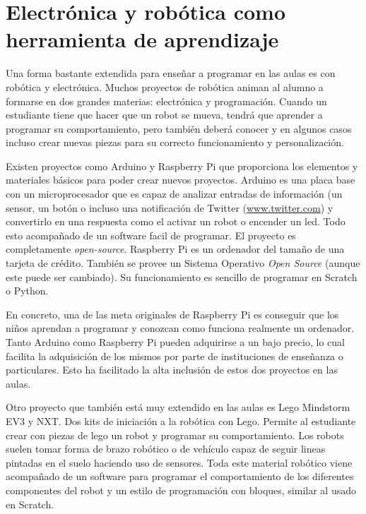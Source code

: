 \section{Electrónica y robótica como herramienta de aprendizaje}
\label{sec:electronica-robotica}


Una forma bastante extendida para enseñar a programar en las aulas es con robótica y electrónica. Muchos proyectos de robótica animan al alumno a formarse en dos grandes materias: electrónica y programación. Cuando un estudiante tiene que hacer que un robot se mueva, tendrá que aprender a programar su comportamiento, pero también deberá conocer y en algunos casos incluso crear nuevas piezas para su correcto funcionamiento y personalización.

Existen proyectos como Arduino\cite{arduino} y Raspberry Pi\cite{raspberry-pi} que proporciona los elementos y materiales básicos para poder crear nuevos proyectos. Arduino es una placa base con un microprocesador que es capaz de analizar entradas de información (un sensor, un botón o incluso una notificación de Twitter (\url{www.twitter.com}) y convertirlo en una respuesta como el activar un robot o encender un led. Todo esto acompañado de un software facil de programar. El proyecto es completamente \emph{\gls{open-source}}. Raspberry Pi es un ordenador del tamaño de una tarjeta de crédito. También se provee un Sistema Operativo \emph{Open Source} (aunque este puede ser cambiado). Su funcionamiento es sencillo de programar en Scratch\cite{scratch} o Python\cite{python,lutz2013learning}.

En concreto, una de las meta originales de Raspberry Pi es conseguir que los niños aprendan a programar y conozcan como funciona realmente un ordenador. Tanto Arduino como Raspberry Pi pueden adquirirse a un bajo precio, lo cual facilita la adquisición de los mismos por parte de instituciones de enseñanza o particulares. Esto ha facilitado la alta inclusión de estos dos proyectos en las aulas.

Otro proyecto que también está muy extendido en las aulas es Lego Mindstorm EV3 y NXT\cite{lego-mindstorm}. Dos kits de iniciación a la robótica con Lego. Permite al estudiante crear con piezas de lego un robot y programar su comportamiento. Los robots suelen tomar forma de brazo robótico o de vehículo capaz de seguir lineas pintadas en el suelo haciendo uso de sensores. Toda este material robótico viene acompañado de un software para programar el comportamiento de los diferentes componentes del robot y un estilo de programación con bloques\cite{lego-mindstorm-programar}, similar al usado en Scratch.


